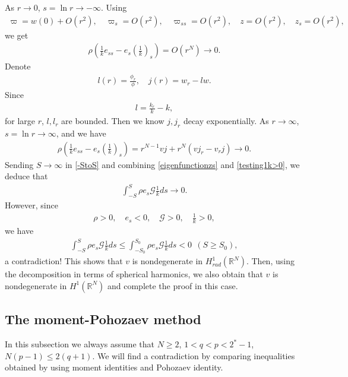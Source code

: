 \documentclass{article}
\theoremstyle{definition} \theoremstyle{remark}
\numberwithin{equation}{section}
\newcommand{\R}{\mathbb{R}}
\newcommand{\G}{\mathcal{G}}
\begin{document}
	As $r \to 0$, $s = \ln r \to -\infty$. Using
	\begin{align*}
		\varpi = w(0) + O(r^2), \quad \varpi_s = O(r^2), \quad \varpi_{ss} = O(r^2), \quad z = O(r^2), \quad z_s = O(r^2),
	\end{align*}
	we get
	\begin{align*}
		\rho \left(\frac{1}{k}e_{ss} - e_s\left(\frac{1}{k}\right)_s\right) = O(r^{N}) \to 0.
	\end{align*}
	Denote
	\begin{align*}
		l(r) = \frac{\phi_r}{\phi}, \quad j(r) = w_r - lw.
	\end{align*}
	Since
	\begin{align*}
		l = \frac{k_r}{k} - k,
	\end{align*}
	for large $r$, $l, l_r$ are bounded. Then we know $j, j_r$ decay exponentially. As $r \to \infty$, $s = \ln r \to \infty$, and we have
	\begin{align*}
		\rho \left(\frac{1}{k}e_{ss} - e_s\left(\frac{1}{k}\right)_s\right) = r^{N-1}vj + r^N\left(vj_r-v_rj\right)\to 0.
	\end{align*}
	Sending $S \to \infty$ in \eqref{-StoS} and combining \eqref{eigenfunctionzs} and \eqref{testing1k>0}, we deduce that
	\begin{align*}
		\int_{-S}^S\rho e_s \G\frac{1}{k}ds \to 0.
	\end{align*}
	However, since
	\begin{align*}
		\rho > 0, \quad e_s < 0, \quad \G > 0, \quad \frac{1}{k} > 0,
	\end{align*}
	we have
	\begin{align*}
		\int_{-S}^S\rho e_s \G\frac{1}{k}ds \le \int_{-S_0}^{S_0}\rho e_s \G\frac{1}{k}ds < 0 ~~ (S \ge S_0),
	\end{align*}
	a contradiction! This shows that $v$ is nondegenerate in $H_{rad}^1(\R^N)$. Then, using the decomposition in terms of spherical harmonics, we also obtain that $v$ is nondegenerate in $H^1(\R^N)$ and complete the proof in this case.

	\subsection{The moment-Pohozaev method} \label{subM-Pmethod}

	In this subsection we always assume that $N \ge 2$, $1 < q < p < 2^* - 1$, $N(p-1) \le 2(q+1)$. We will find a contradiction by comparing inequalities obtained by using moment identities and Pohozaev identity.
\end{document}
